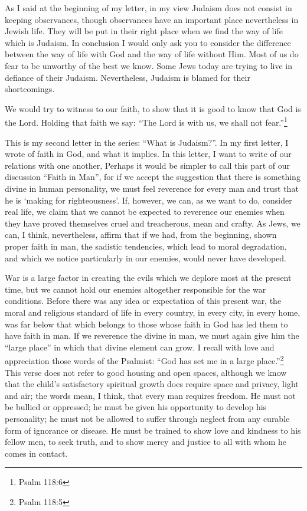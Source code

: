 As I said at the beginning of my letter, in my view
Judaism does not consist in keeping observances, though
observances have an important place nevertheless in Jewish
life. They will be put in their right place when we find
the way of life which is Judaism. In conclusion I would
only ask you to consider the difference between the way of
life with God and the way of life without Him. Most of us
do fear to be unworthy of the best we know. Some Jews
today are trying to live in defiance of their Judaism.
Nevertheless, Judaism is blamed for their shortcomings.

We would try to witness to our faith, to show that it
is good to know that God is the Lord. Holding that faith
we say: ``The Lord is with us, we shall not fear.''\footnote{Psalm 118:6}

\vspace{2\baselineskip}

This is my second letter in the series: ``What is Judaism?''.
In my first letter, I wrote of faith in God,
and what it implies. In this letter, I want to write of
our relations with one another, Perhaps it would be
simpler to call this part of our discussion ``Faith in Man'',
for if we accept the suggestion that there is something
divine in human personality, we must feel reverence for
every man and trust that he is ‘making for righteousness’.
If, however, we can, as we want to do, consider real life,
we claim that we cannot be expected to reverence our
enemies when they have proved themselves cruel and
treacherous, mean and crafty. As Jews, we can, I think,
nevertheless, affirm that if we had, from the beginning,
shown proper faith in man, the sadistic tendencies, which
lead to moral degradation, and which we notice particularly
in our enemies, would never have developed.

War is a large factor in creating the evils which we
deplore most at the present time, but we cannot hold our
enemies altogether responsible for the war conditions.
Before there was any idea or expectation of this present
war, the moral and religious standard of life in every
country, in every city, in every home, was far below that
which belongs to those whose faith in God has led them to
have faith in man. If we reverence the divine in man, we
must again give him the ``large place'' in which that divine
element can grow. I recall with love and appreciation
those words of the Psalmist: ``God has set me in a large
place.''\footnote{Psalm 118:5} This verse does not refer to good housing and
open spaces, although we know that the child's satisfactory
spiritual growth does require space and privacy, light and
air; the words mean, I think, that every man requires
freedom. He must not be bullied or oppressed; he must be
given his opportunity to develop his personality; he must
not be allowed to suffer through neglect from any curable
form of ignorance or disease. He must be trained to show
love and kindness to his fellow men, to seek truth, and to
show mercy and justice to all with whom he comes in
contact.

